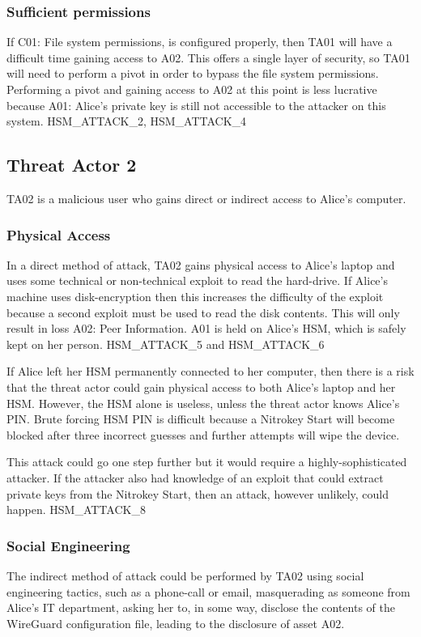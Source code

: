 \documentclass [11pt, proquest] {uwthesis}[2020/02/24]
\begin{document}
\subsubsection{Sufficient permissions}
If C01: File system permissions, is configured properly, then TA01 will have a difficult time gaining access to A02. This offers a single layer of security, so TA01 will need to perform a pivot in order to bypass the file system permissions. Performing a pivot and gaining access to A02 at this point is less lucrative because A01: Alice's private key is still not accessible to the attacker on this system.
HSM_ATTACK_2, HSM_ATTACK_4

\subsection{Threat Actor 2}
TA02 is a malicious user who gains direct or indirect access to Alice's computer. 

\subsubsection{Physical Access}
In a direct method of attack, TA02 gains physical access to Alice's laptop and uses some technical or non-technical exploit to read the hard-drive. If Alice's machine uses disk-encryption then this increases the difficulty of the exploit because a second exploit must be used to read the disk contents.
This will only result in loss A02: Peer Information. A01 is held on Alice's HSM, which is safely kept on her person.
HSM_ATTACK_5 and HSM_ATTACK_6 

If Alice left her HSM permanently connected to her computer, then there is a risk that the threat actor could gain physical access to both Alice's laptop and her HSM. However, the HSM alone is useless, unless the threat actor knows Alice's PIN. Brute forcing HSM PIN is difficult because a Nitrokey Start will become blocked after three incorrect guesses and further attempts will wipe the device.

This attack could go one step further but it would require a highly-sophisticated attacker. If the attacker also had knowledge of an exploit that could extract private keys from the Nitrokey Start, then an attack, however unlikely, could happen.
HSM_ATTACK_8

\subsubsection{Social Engineering}
The indirect method of attack could be performed by TA02 using social engineering tactics, such as a phone-call or email, masquerading as someone from Alice's IT department, asking her to, in some way, disclose the contents of the WireGuard configuration file, leading to the disclosure of asset A02.
\end{document}
